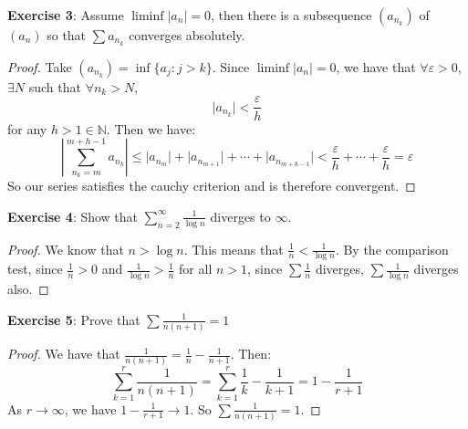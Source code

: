 \documentclass{article}
\begin{document}
\textbf{Exercise 3}: Assume $\liminf \lvert a_{n} \rvert = 0$, then there is a subsequence $(a_{n_{k}})$ of $(a_{n})$ so that $\sum a_{n_{k}}$ converges absolutely.
    \begin{proof}
        Take $(a_{n_{k}}) = \inf\{a_{j} : j > k\}$. Since $\liminf \lvert a_{n} \rvert = 0$, we have that $\forall \varepsilon > 0$, $\exists N$ such that $\forall n_{k} > N$, 
            \begin{equation*}
                \lvert a_{n_{k}} \rvert < \dfrac{\varepsilon}{h}
            \end{equation*}
        for any $h > 1 \in \mathbb{N}$. Then we have:
            \begin{equation*}
                \left\lvert \sum_{n_{k} = m}^{m + h - 1}a_{n_{k}} \right\rvert \leq \lvert a_{n_{m}} \rvert + \lvert a_{n_{m + 1}} \rvert + \cdots + \lvert a_{n_{m + h - 1}} \rvert < \dfrac{\varepsilon}{ h} + \cdots + \dfrac{\varepsilon}{ h} = \varepsilon
            \end{equation*}
        So our series satisfies the cauchy criterion and is therefore convergent.
    \end{proof}

\textbf{Exercise 4}: Show that $\sum_{n = 2}^{\infty}\frac{1}{\mathop{log}n}$ diverges to $\infty$.
    \begin{proof}
        We know that $n > \log n$. This means that $\frac{1}{n} < \frac{1}{\log n}$. By the comparison test, since $\frac{1}{n}> 0$ and $\frac{1}{\log n} > \frac{1}{n}$ for all $n > 1$, since $\sum\frac{1}{n}$ diverges, $\sum\frac{1}{\log n}$ diverges also.
    \end{proof}

\textbf{Exercise 5}: Prove that $\sum \frac{1}{n(n + 1)} = 1$
    \begin{proof}
        We have that $\frac{1}{n(n + 1)} = \frac{1}{n} - \frac{1}{n + 1}$. Then:
            \begin{equation*}
                \sum_{k = 1}^{r} \dfrac{1}{n(n + 1)} = \sum_{k = 1}^{r} \dfrac{1}{k} - \dfrac{1}{k + 1} = 1 - \dfrac{1}{r + 1}
            \end{equation*}
        As $r \rightarrow \infty $, we have $1 - \frac{1}{r + 1} \rightarrow 1$. So $\sum\frac{1}{n(n + 1)} = 1$.
    \end{proof}
\end{document}
